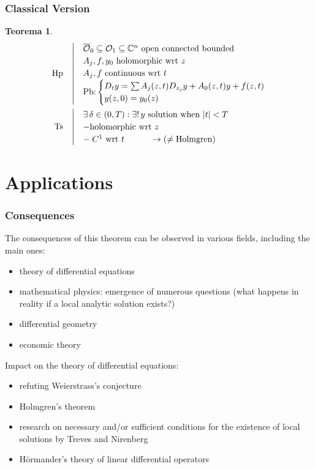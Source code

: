 \documentclass[serif,notheorems]{beamer}
\makeatletter
\newenvironment{ipotesi}%
{\quad\left|\quad\def\arraystretch{1.2}\begin{array}{@{}l@{}}}%
{\end{array}\right.}
\newcommand{\hpth}[2]
{
\begin{align*}
\quad
\text{Hp}
&\begin{ipotesi}
#1
\end{ipotesi}\\
\text{Ts}
&\begin{ipotesi}
#2
\end{ipotesi}
\end{align*}
}
\theoremstyle{definition} %
\newtheorem{theorem}{Teorema}[section] %
\theoremstyle{remark}
\makeatother
\begin{document}
\begin{frame}
\frametitle{Classical Version}
\begin{theorem}
\vspace{-5mm}
\hpth{
\overline{\mathcal{O}}_0 \subseteq \mathcal{O}_1 \subseteq \mathbb{C}^n \text{ open connected bounded}\\
A_j, f, y_0 \text{ holomorphic wrt } z\\
A_j, f \text{ continuous wrt } t\\
\text{Pb:}
\begin{cases}
D_t y = \sum A_j (z,t) D_{z_j}y+A_0(z,t)y +f(z,t) \\
y(z,0)=y_0(z)
\end{cases}\\
}{
\exists \, \delta \in (0,T) : \exists !\, y \text{ solution when } |t|<T \\
- \text{holomorphic wrt } z\\
- \; C^1 \text{ wrt } t \quad \quad \quad \rightarrow (\neq \text{Holmgren})
}
\end{theorem}
\end{frame}

\section{Applications}

\begin{frame}
\frametitle{Consequences}
The consequences of this theorem can be observed in various fields, including the main ones:
\begin{itemize}
\item theory of differential equations
\item mathematical physics: emergence of numerous questions (what happens in reality if a local analytic solution exists?)
\item differential geometry
\item economic theory
\end{itemize}
\end{frame}

\begin{frame}
Impact on the theory of differential equations:
\begin{itemize}
\item refuting Weierstrass's conjecture
\item Holmgren's theorem
\item research on necessary and/or sufficient conditions for the existence of local solutions by Treves and Nirenberg
\item Hörmander's theory of linear differential operators
\end{itemize}
\end{frame}
\end{document}
